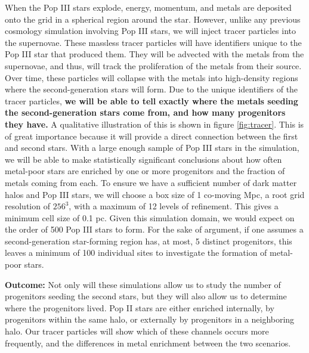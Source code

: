 \documentclass[a4paper, 12pt]{article}
\begin{document}
When the Pop III stars explode, energy, momentum, and metals are deposited onto the grid in a spherical region around the star. However, unlike any previous cosmology simulation involving Pop III stars, we will inject tracer particles into the supernovae. These massless tracer particles will have identifiers unique to the Pop III star that produced them. They will be advected with the metals from the supernovae, and thus, will track the proliferation of the metals from their source. Over time, these particles will collapse with the metals into high-density regions where the second-generation stars will form. Due to the unique identifiers of the tracer particles, \textbf{we will be able to tell exactly where the metals seeding the second-generation stars come from, and how many progenitors they have.} A qualitative illustration of this is shown in figure \ref{fig:tracer}. This is of great importance because it will provide a direct connection between the first and second stars. With a large enough sample of Pop III stars in the simulation, we will be able to make statistically significant conclusions about how often metal-poor stars are enriched by one or more progenitors and the fraction of metals coming from each. To ensure we have a sufficient number of dark matter halos and Pop III stars, we will choose a box size of 1 co-moving Mpc, a root grid resolution of $256^3$, with a maximum of 12 levels of refinement. This gives a minimum cell size of 0.1 pc. Given this simulation domain, we would expect on the order of 500 Pop III stars to form. For the sake of argument, if one assumes a second-generation star-forming region has, at most, 5 distinct progenitors, this leaves a minimum of 100 individual sites to investigate the formation of metal-poor stars.

\textbf{Outcome:} Not only will these simulations allow us to study the number of progenitors seeding the second stars, but they will also allow us to determine where the progenitors lived. Pop II stars are either enriched internally, by progenitors within the same halo, or externally by progenitors in a neighboring halo. Our tracer particles will show which of these channels occurs more frequently, and the differences in metal enrichment between the two scenarios. 
\end{document}
